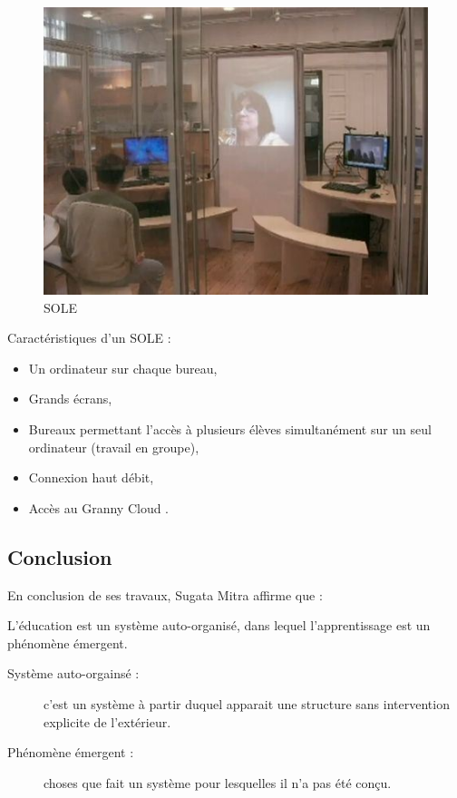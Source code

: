 \begin{figure}[H]
  \includegraphics[width=\textwidth]{../resources/illustrations/soles}
  \caption{\gls{SOLE}}
\end{figure}

Caractéristiques d'un \gls{SOLE} :

\begin{itemize}
  \item Un ordinateur sur chaque bureau,
  \item Grands écrans,
  \item Bureaux permettant l'accès à plusieurs élèves simultanément sur un seul ordinateur (travail en groupe),
  \item Connexion haut débit,
  \item Accès au \og Granny Cloud \fg{}.
\end{itemize}

\subsection{Conclusion}
En conclusion de ses travaux, Sugata Mitra affirme que :

\begin{coolquote}
  L'éducation est un système auto-organisé, dans lequel l'apprentissage est un phénomène émergent.
\end{coolquote}

\begin{description}
  \item[Système auto-orgainsé :] c'est un système à partir duquel apparait une structure sans intervention explicite de l'extérieur.
  \item[Phénomène émergent :] choses que fait un système pour lesquelles il n'a pas été conçu.
\end{description}

